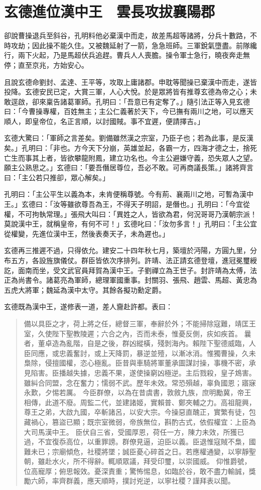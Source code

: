 
\chapter{玄德進位漢中王　雲長攻拔襄陽郡}

卻說曹操退兵至斜谷，孔明料他必棄漢中而走，故差馬超等諸將，分兵十數路，不時攻劫；因此操不能久住。又被魏延射了一箭，急急班師。三軍銳氣墮盡。前隊纔行，兩下火起，乃是馬超伏兵追趕。曹兵人人喪膽。操令軍士急行，曉夜奔走無停；直至京兆，方始安心。

且說玄德命劉封、孟達、王平等，攻取上庸諸郡。申耽等聞操已棄漢中而走，遂皆投降。玄德安民已定，大賞三軍，人心大悅。於是眾將皆有推尊玄德為帝之心；未敢逕啟，卻來稟告諸葛軍師。孔明曰：「吾意已有定奪了。」隨引法正等入見玄德曰：「今曹操專權，百姓無主；主公仁義著於天下，今已撫有兩川之地，可以應天順人，即皇帝位，名正言順，以討國賊。事不宜遲，便請擇吉。」

玄德大驚曰：「軍師之言差矣。劉備雖然漢之宗室，乃臣子也；若為此事，是反漢矣。」孔明曰：「非也。方今天下分崩，英雄並起，各霸一方，四海才德之士，捨死亡生而事其上者，皆欲攀龍附鳳，建立功名也。今主公避嫌守義，恐失眾人之望。願主公熟思之。」玄德曰：「要吾僭居尊位，吾必不敢。可再商議長策。」諸將齊言曰：「主公若只推卻，眾心解矣。」

孔明曰：「主公平生以義為本，未肯便稱尊號。今有荊、襄兩川之地，可暫為漢中王。」玄德曰：「汝等雖欲尊吾為王，不得天子明詔，是僭也。」孔明曰：「今宜從權，不可拘執常理。」張飛大叫曰：「異姓之人，皆欲為君，何況哥哥乃漢朝宗派！莫說漢中王，就稱皇帝，有何不可！」玄德叱曰：「汝勿多言！」孔明曰：「主公宜從權變，先進位漢中王，然後表奏天子，未為遲也。」

玄德再三推遲不過，只得依允。建安二十四年秋七月，築壇於沔陽，方圓九里，分布五方，各設旌旗儀仗。群臣皆依次序排列。許靖、法正請玄德登壇，進冠冕璽綬訖，面南而坐，受文武官員拜賀為漢中王。子劉禪立為王世子。封許靖為太傅，法正為尚書令。諸葛亮為軍師，總理軍國重事。封關羽、張飛、趙雲、馬超、黃忠為五虎大將軍；魏延為漢中太守。其餘各擬功勳定爵。

玄德既為漢中王，遂修表一道，差人齎赴許都。表曰：

\begin{quote}
備以具臣之才，荷上將之任，總督三軍，奉辭於外；不能掃除寇難，靖匡王室，久使陛下聖教陵遲；六合之內，否而未泰，惟憂反側，疢如疾首。
曩者，董卓造為亂階，自是之後，群凶縱橫，殘剝海內。賴陛下聖德威臨，人臣同應，或忠義奮討，或上天降罰，暴逆並殪，以漸冰消。惟獨曹操，久未梟除，侵擅國權，恣心極亂。臣昔與車騎將軍董承圖謀討操，事機不密，承見陷害。臣播越失據，忠義不果，遂使操窮凶極逆。主后戮殺，皇子鴆害。雖糾合同盟，念在奮力；懦弱不武。歷年未效。常恐殞越，辜負國恩；寤寐永歎，夕惕若厲。
今臣群僚，以為在昔虞書，敦敘九族，庶明勵冀，帝王相傳，此道不廢。周監二代，並建諸姬，實賴普、鄭夾輔之力。高祖龍興，尊王之弟，大啟九國，卒斬諸呂，以安大宗。今操惡直醜正，實繁有徒，包藏禍心，篡盜已顯；既宗室微弱，帝族無位，斟酌古式，依假權宜：上臣為大司馬漢中王。
臣伏自三省，受國厚恩，荷任一方，陳力未效，所獲已過，不宜復忝高位，以重罪謗。群僚見逼，迫臣以義。臣退惟寇賊不梟，國難未已；宗廟傾危，社稷將墜；誠臣憂心碎首之日。若應權通變，以寧靜聖朝，雖赴水火，所不得辭。輒順眾議，拜受印璽，以崇國威。
仰惟爵號，位高寵厚；俯思報效。憂深責重；驚怖惕息，如臨於谷，敢不盡力輸誠，獎勵六師，率齊群義，應天順時，撲討兇逆，以寧社稷？謹拜表以聞。
\end{quote}

